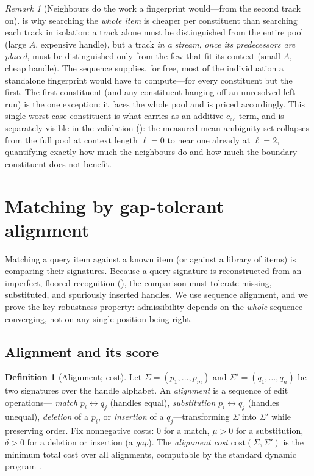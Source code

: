 \documentclass[11pt,twocolumn,a4paper]{article}
\theoremstyle{thmstyle}
\theoremstyle{definition}
\newtheorem{definition}[theorem]{Definition}
\theoremstyle{remark}
\newtheorem{remark}[theorem]{Remark}
\newcommand{\sig}{\Sigma}
\begin{document}
\begin{remark}[Neighbours do the work a fingerprint would---from the second track on]
\label{rem:neighbours}
 is why searching the \emph{whole item} is cheaper per
constituent than searching each track in isolation: a track alone must be
distinguished from the entire pool (large $A$, expensive handle), but a track
\emph{in a stream}, \emph{once its predecessors are placed}, must be
distinguished only from the few that fit its context (small $A$, cheap handle).
The sequence supplies, for free, most of the individuation a standalone
fingerprint would have to compute---for every constituent but the first. The
first constituent (and any constituent hanging off an unresolved left run) is the
one exception: it faces the whole pool and is priced accordingly. This single
worst-case constituent is what  carries as an additive
$c_{\mathrm{ac}}$ term, and is separately visible in the validation
(): the measured mean ambiguity set collapses from the full
pool at context length $\ell=0$ to near one already at $\ell=2$, quantifying
exactly how much the neighbours do and how much the boundary constituent does
not benefit.
\end{remark}

\section{Matching by gap-tolerant alignment}
\label{sec:matching}

Matching a query item against a known item (or against a library of items) is
comparing their signatures. Because a query signature is reconstructed from an
imperfect, floored recognition (), the comparison must tolerate
missing, substituted, and spuriously inserted handles. We use sequence
alignment, and we prove the key robustness property: admissibility depends on the
\emph{whole} sequence converging, not on any single position being right.

\subsection{Alignment and its score}

\begin{definition}[Alignment; cost]
\label{def:alignment}
Let $\sig=(p_1,\dots,p_m)$ and $\sig'=(q_1,\dots,q_n)$ be two signatures over the
handle alphabet. An \emph{alignment} is a sequence of edit operations---%
\emph{match} $p_i\leftrightarrow q_j$ (handles equal), \emph{substitution}
$p_i\leftrightarrow q_j$ (handles unequal), \emph{deletion} of a $p_i$, or
\emph{insertion} of a $q_j$---transforming $\sig$ into $\sig'$ while preserving
order. Fix nonnegative costs: $0$ for a match, $\mu>0$ for a substitution,
$\delta>0$ for a deletion or insertion (a \emph{gap}). The \emph{alignment cost}
$\mathrm{cost}(\sig,\sig')$ is the minimum total cost over all alignments,
computable by the standard dynamic program \citep{needleman1970,levenshtein1966}.
\end{definition}
\end{document}
